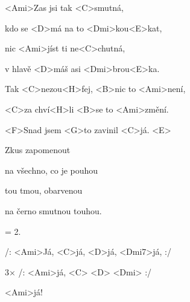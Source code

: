 

\zs
<Ami>Zas jsi tak <C>smutná,

kdo se <D>má na to <Dmi>kou<E>kat,

nic <Ami>jíst ti ne<C>chutná,

v hlavě <D>máš asi <Dmi>brou<E>ka.
\ks

\zr
Tak <C>nezou<H>fej, <B>nic to <Ami>není,

<C>za chví<H>li <B>se to <Ami>změní.

<F>Snad jsem <G>to zavinil <C>já. <E>
\kr

\zs
Zkus zapomenout

na všechno, co je pouhou

tou tmou, obarvenou

na černo smutnou touhou.
\ks

\zr \kr

\zs
= 2.
\ks

\zr \kr

/: <Ami>Já, <C>já, <D>já, <Dmi7>já, :/

3× /: <Ami>já, <C> <D> <Dmi> :/

<Ami>já!

\kp
